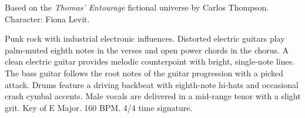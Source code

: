 

\begin{notes}
Based on the \emph{Thomas’ Entourage} fictional universe by Carlos Thompson.\\
Character: Fiona Levit.\\
\end{notes}

\begin{style}
Punk rock with industrial electronic influences. %
Distorted electric guitars play palm-muted eighth notes in the verses and open power chords in the chorus. %
A clean electric guitar provides melodic counterpoint with bright, single-note lines. %
The bass guitar follows the root notes of the guitar progression with a picked attack. %
Drums feature a driving backbeat with eighth-note hi-hats and occasional crash cymbal accents. %
Male vocals are delivered in a mid-range tenor with a slight grit. %
Key of E Major. %
160 BPM. %
4/4 time signature.
\end{style}

